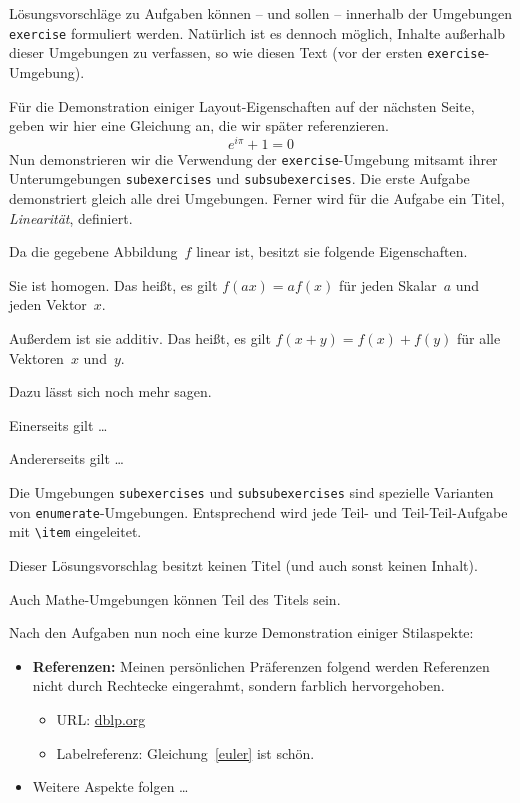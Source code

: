 \documentclass[
]{exercss}
\begin{document}
	Lösungsvorschläge zu Aufgaben können -- und sollen -- innerhalb der Umgebungen \texttt{exercise} formuliert werden. Natürlich ist es dennoch möglich, Inhalte außerhalb dieser Umgebungen zu verfassen, so wie diesen Text (vor der ersten \texttt{exercise}-Umgebung).

	Für die Demonstration einiger Layout-Eigenschaften auf der nächsten Seite, geben wir hier eine Gleichung an, die wir später referenzieren.
	\begin{equation}
		\label{euler}
		e^{i\pi} + 1 = 0
	\end{equation}
	Nun demonstrieren wir die Verwendung der \texttt{exercise}-Umgebung mitsamt ihrer Unterumgebungen \texttt{subexercises} und \texttt{subsubexercises}. Die erste Aufgabe demonstriert gleich alle drei Umgebungen. Ferner wird für die Aufgabe ein Titel, \emph{Linearität}, definiert.
	\begin{exercise}[title=Linearität]
		Da die gegebene Abbildung~$f$ linear ist, besitzt sie folgende Eigenschaften.
		\begin{subexercises}
		\item Sie ist homogen. Das heißt, es gilt $f(ax) = af(x)$ für jeden Skalar~$a$ und jeden Vektor~$x$.
		\item Außerdem ist sie additiv. Das heißt, es gilt $f(x+y) = f(x) + f(y)$ für alle Vektoren~$x$ und~$y$.

			Dazu lässt sich noch mehr sagen.
			\begin{subsubexercises}
			\item Einerseits gilt \dots
			\item Andererseits gilt \dots
			\end{subsubexercises}
		\end{subexercises}
	\end{exercise}
	Die Umgebungen \texttt{subexercises} und \texttt{subsubexercises} sind spezielle Varianten von \texttt{enumerate}-Umgebungen. Entsprechend wird jede Teil- und Teil-Teil-Aufgabe mit \verb+\item+ eingeleitet.
	\begin{exercise}
		Dieser Lösungsvorschlag besitzt keinen Titel (und auch sonst keinen Inhalt).
	\end{exercise}
	\begin{exercise}[title={$\log(e^x) = x$}]
		Auch Mathe-Umgebungen können Teil des Titels sein.
	\end{exercise}
	Nach den Aufgaben nun noch eine kurze Demonstration einiger Stilaspekte:
	\begin{itemize}
		\item \textbf{Referenzen:} Meinen persönlichen Präferenzen folgend werden Referenzen nicht durch Rechtecke eingerahmt, sondern farblich hervorgehoben.
			\begin{itemize}
				\item URL: \url{dblp.org}
				\item Labelreferenz: Gleichung~\eqref{euler} ist schön.
			\end{itemize}
		\item Weitere Aspekte folgen \dots
	\end{itemize}
\end{document}
